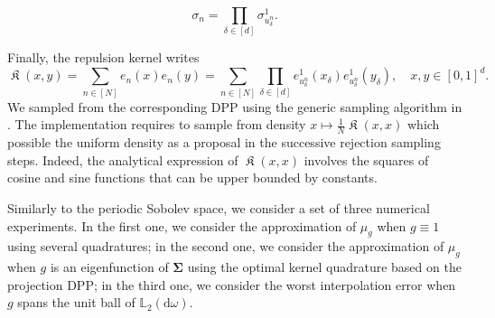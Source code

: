 \documentclass[twoside,11pt]{book}
\numberwithin{theorem}{chapter}
\numberwithin{definition}{chapter}
\numberwithin{proposition}{chapter}
\numberwithin{corollary}{chapter}
\numberwithin{example}{chapter}
\numberwithin{lemma}{chapter}
\DeclareMathOperator*{\KDPP}{\mathfrak{K}}
\begin{document}
\begin{equation}
\sigma_{n} = \prod\limits_{\delta \in [d]} \sigma_{u_{\delta}^{n}}^{1}.
\end{equation}



Finally, the repulsion kernel writes
\begin{equation}
\KDPP(x,y) =\sum\limits_{n \in [N]} e_{n}(x)e_{n}(y) = \sum\limits_{n \in [N]} \prod\limits_{\delta \in [d]}e_{u^{n}_{\delta}}^{1} (x_{\delta}) e_{u^{n}_{\delta}}^{1} (y_{\delta}), \quad x,y\in [0,1]^d.
\end{equation}
We sampled from the corresponding DPP using the generic sampling algorithm in \cite{HoKrPeVi06}. The implementation requires to sample from density $x \mapsto \frac{1}{N} \KDPP(x,x)$ which possible the uniform density as a proposal in the successive rejection sampling steps. Indeed, the analytical expression of $\KDPP(x,x)$ involves the squares of cosine and sine functions that can be upper bounded by constants.


Similarly to the periodic Sobolev space, we consider a set of three numerical experiments. In the first one, we consider the approximation of $\mu_{g}$ when $g \equiv 1$ using several quadratures; in the second one, we consider the approximation of $\mu_{g}$ when $g$ is an eigenfunction of $\bm{\Sigma}$ using the optimal kernel quadrature based on the projection DPP; in the third one, we consider the worst interpolation error when $g$ spans the unit ball of $\mathbb{L}_{2}(\mathrm{d}\omega)$. 
\end{document}
